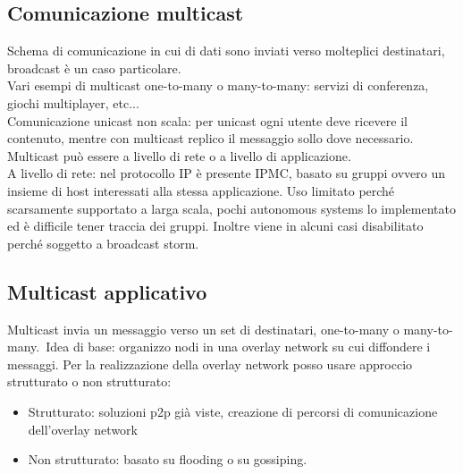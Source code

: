 \documentclass[16px]{article}
\begin{document}
\subsection{Comunicazione multicast}
Schema di comunicazione in cui di dati sono inviati verso molteplici destinatari, broadcast è un caso particolare.\\ Vari esempi di multicast one-to-many o many-to-many: servizi di conferenza, giochi multiplayer, etc...\\ Comunicazione unicast non scala: per unicast ogni utente deve ricevere il contenuto, mentre con multicast replico il messaggio sollo dove necessario.\\ Multicast può essere a livello di rete o a livello di applicazione.\\
A livello di rete: nel protocollo IP è presente IPMC, basato su gruppi ovvero un insieme di host interessati alla stessa applicazione. Uso limitato perché scarsamente supportato a larga scala, pochi autonomous systems lo implementato ed è difficile tener traccia dei gruppi. Inoltre viene in alcuni casi disabilitato perché soggetto a broadcast storm.
\subsection{Multicast applicativo}
Multicast invia un messaggio verso un set di destinatari, one-to-many o many-to-many.\ Idea di base: organizzo nodi in una overlay network su cui diffondere i messaggi. Per la realizzazione della overlay network posso usare approccio strutturato o non strutturato:
\begin{itemize}
\item Strutturato: soluzioni p2p già viste, creazione di percorsi di comunicazione dell'overlay network
\item Non strutturato: basato su flooding o su gossiping.
\end{itemize}
\end{document}
